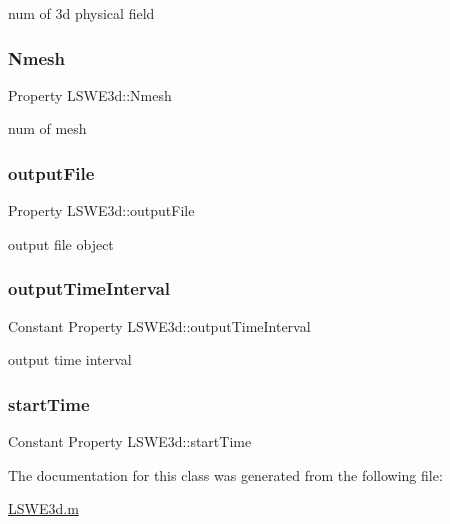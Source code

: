 num of 3d physical field 

\mbox{\label{class_l_s_w_e3d_aa9ca3b8035860972759ada67bd3f44d2}} 
\subsubsection{\texorpdfstring{Nmesh}{Nmesh}}
{\footnotesize\ttfamily Property L\+S\+W\+E3d\+::\+Nmesh\hspace{0.3cm}{\ttfamily [protected]}}



num of mesh 

\mbox{\label{class_l_s_w_e3d_ad7adc998480d20be459d3ae030bd1008}} 
\subsubsection{\texorpdfstring{output\+File}{outputFile}}
{\footnotesize\ttfamily Property L\+S\+W\+E3d\+::output\+File\hspace{0.3cm}{\ttfamily [protected]}}



output file object 

\mbox{\label{class_l_s_w_e3d_ac7fdd52c7fd26c4c17d559de23773be6}} 
\subsubsection{\texorpdfstring{output\+Time\+Interval}{outputTimeInterval}}
{\footnotesize\ttfamily Constant Property L\+S\+W\+E3d\+::output\+Time\+Interval}



output time interval 

\mbox{\label{class_l_s_w_e3d_a44fbe9f87718a749072e1b78f1f81415}} 
\subsubsection{\texorpdfstring{start\+Time}{startTime}}
{\footnotesize\ttfamily Constant Property L\+S\+W\+E3d\+::start\+Time}



The documentation for this class was generated from the following file\+:\begin{DoxyCompactItemize}
\item 
\hyperlink{_l_s_w_e3d_8m}{L\+S\+W\+E3d.\+m}\end{DoxyCompactItemize}
